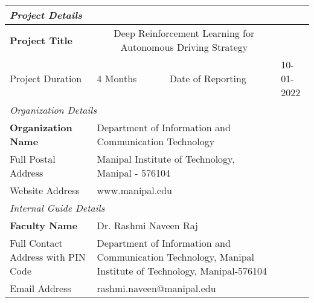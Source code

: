 \begin{table}
\begin{scriptsize}
\begin{tabularx}{\textwidth}{|p{2cm}|p{3cm}|p{2cm}|p{2cm}|}
\multicolumn{4}{l}{\textit{Project Details}}\\ \hline
\textbf{Project Title}&\multicolumn{2}{c}{Deep Reinforcement Learning for Autonomous Driving Strategy}& \\ \hline
Project Duration& 4 Months&Date of Reporting& 10-01-2022 \\ \hline
\multicolumn{4}{l}{\textit{Organization Details}}\\ \hline
\textbf{Organization Name}&\multicolumn{2}{l}{Department of Information and Communication Technology}& \\ \hline
Full Postal Address&\multicolumn{2}{p{8cm}}{Manipal Institute of Technology, Manipal - 576104} &\\ \hline
Website Address&\multicolumn{2}{X}{www.manipal.edu} &\\ \hline
\multicolumn{4}{l}{\textit{Internal Guide Details}}\\ \hline
\textbf{Faculty Name}&\multicolumn{2}{p{8cm}}{Dr. Rashmi Naveen Raj} &\\ \hline
Full Contact Address with PIN Code&\multicolumn{2}{p{8cm}}{Department of Information and Communication Technology,  Manipal Institute of Technology, Manipal-576104}& \\ \hline
Email Address&\multicolumn{2}{l}{rashmi.naveen@manipal.edu}&\\  \hline
\end{tabularx}
\end{scriptsize}
\end{table}
